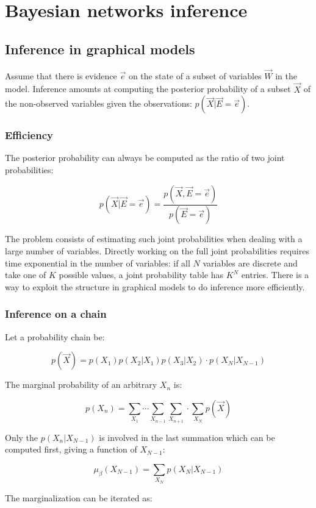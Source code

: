 \chapter{Bayesian networks inference}

\section{Inference in graphical models}
Assume that there is evidence $\vec{e}$ on the state of a subset of variables $\vec{W}$ in the model.
Inference amounts at computing the posterior probability of a subset $\vec{X}$ of the non-observed variables given the observations: $p(\vec{X}|\vec{E}=\vec{e})$.

	\subsection{Efficiency}
	The posterior probability can always be computed as the ratio of two joint probabilities:

	$$p(\vec{X}|\vec{E}=\vec{e})=\frac{p(\vec{X},\vec{E}=\vec{e})}{p(\vec{E}=\vec{e})}$$

	The problem consists of estimating such joint probabilities when dealing with a large number of variables.
	Directly working on the full joint probabilities requires time exponential in the number of variables: if all $N$ variables are discrete and take one of $K$ possible values, a joint probability table has $K^N$ entries.
	There is a way to exploit the structure in graphical models to do inference more efficiently.

	\subsection{Inference on a chain}
	Let a probability chain be:

  $$p(\vec{X}) = p(X_1)p(X_2|X_1)p(X_3|X_2)\cdot p(X_N|X_{N-1})$$

	The marginal probability of an arbitrary $X_n$ is:

  $$p(X_n) = \sum\limits_{X_1}\cdots\sum\limits_{X_{n-1}}\sum\limits_{X_{n+1}}\cdot\sum\limits_{X_{N}}p(\vec{X})$$

	Only the $p(X_n|X_{N-1})$ is involved in the last summation which can be computed first, giving a function of $X_{N-1}$:

	$$\mu_\beta(X_{N-1}) = \sum\limits_{X_N}p(X_N|X_{N-1})$$

	The marginalization can be iterated as:

